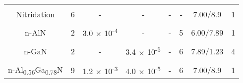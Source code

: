 \begin{table}[!h]
{\begin{minipage}{17cm}
{\begin{tabular}{cccccccc}
\cellcolor{Gray} & \cellcolor{Gray} & \cellcolor{Gray} & \cellcolor{Gray} & \cellcolor{Gray} & \cellcolor{Gray} & \cellcolor{Gray} & \cellcolor{Gray} \\
\multirow{-2}{*}{\cellcolor{Gray} Nitridation} & \multirow{-2}{*}{\cellcolor{Gray} 6} & \multirow{-2}{*}{\cellcolor{Gray} -} & \multirow{-2}{*}{\cellcolor{Gray} -} & \multirow{-2}{*}{\cellcolor{Gray} -} & \multirow{-2}{*}{\cellcolor{Gray} -} & \multirow{-2}{*}{\cellcolor{Gray} 7.00/8.9} & \multirow{-2}{*}{\cellcolor{Gray} 1} \\

\cellcolor{White} & \cellcolor{White} & \cellcolor{White} & \cellcolor{White} & \cellcolor{White} & \cellcolor{White} & \cellcolor{White} & \cellcolor{White} \\
\multirow{-2}{*}{\cellcolor{White} n-AlN} & \multirow{-2}{*}{\cellcolor{White} 2} & \multirow{-2}{*}{\cellcolor{White} 3.0 $\times$ 10\textsuperscript{-4}} & \multirow{-2}{*}{\cellcolor{White} -} & \multirow{-2}{*}{\cellcolor{White} -} & \multirow{-2}{*}{\cellcolor{White} 5} & \multirow{-2}{*}{\cellcolor{White} 6.00/7.89} & \multirow{-2}{*}{\cellcolor{White} 1} \\

\cellcolor{Gray} & \cellcolor{Gray} & \cellcolor{Gray} & \cellcolor{Gray} & \cellcolor{Gray} & \cellcolor{Gray} & \cellcolor{Gray} & \cellcolor{Gray} \\
\multirow{-2}{*}{\cellcolor{Gray} n-GaN} & \multirow{-2}{*}{\cellcolor{Gray} 2} & \multirow{-2}{*}{\cellcolor{Gray} -} & \multirow{-2}{*}{\cellcolor{Gray} 3.4 $\times$ 10\textsuperscript{-5}} & \multirow{-2}{*}{\cellcolor{Gray} -} & \multirow{-2}{*}{\cellcolor{Gray} 6} & \multirow{-2}{*}{\cellcolor{Gray} 7.89/1.23} & \multirow{-2}{*}{\cellcolor{Gray} 4} \\

\cellcolor{White} & \cellcolor{White} & \cellcolor{White} & \cellcolor{White} & \cellcolor{White} & \cellcolor{White} & \cellcolor{White} & \cellcolor{White} \\
\multirow{-2}{*}{\cellcolor{White} n-Al\textsubscript{0.56}Ga\textsubscript{0.78}N} & \multirow{-2}{*}{\cellcolor{White} 9} & \multirow{-2}{*}{\cellcolor{White} 1.2 $\times$ 10\textsuperscript{-3}} & \multirow{-2}{*}{\cellcolor{White} 4.0 $\times$ 10\textsuperscript{-5}} & \multirow{-2}{*}{\cellcolor{White} -} & \multirow{-2}{*}{\cellcolor{White} 6} & \multirow{-2}{*}{\cellcolor{White} 7.00/8.9} & \multirow{-2}{*}{\cellcolor{White} 1} \\


\end{tabular}}
\end{minipage}}
\end{table}
